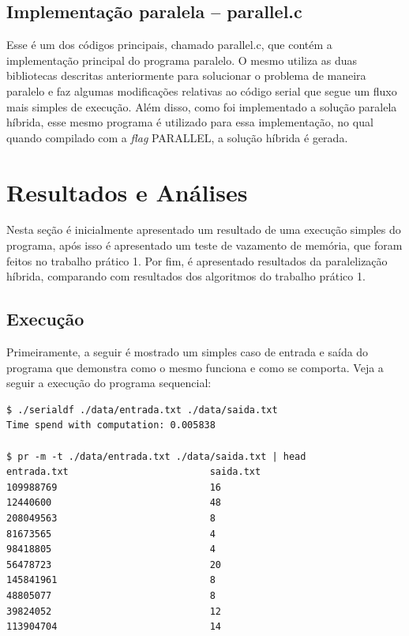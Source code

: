 \documentclass[12pt]{article}
\begin{document}
\subsection{Implementação paralela -- parallel.c}

Esse é um dos códigos principais, chamado parallel.c, que contém a implementação principal do programa paralelo. O mesmo utiliza as duas bibliotecas descritas anteriormente para solucionar o problema de maneira paralelo e faz algumas modificações relativas ao código serial que segue um fluxo mais simples de execução. Além disso, como foi implementado a solução paralela híbrida, esse mesmo programa é utilizado para essa implementação, no qual quando compilado com a \textit{flag} PARALLEL, a solução híbrida é gerada.

\section{Resultados e Análises}
\label{sec:resultados_analises}

Nesta seção é inicialmente apresentado um resultado de uma execução simples do programa, após isso é apresentado um teste de vazamento de memória, que foram feitos no trabalho prático 1. Por fim, é apresentado resultados da paralelização híbrida, comparando com resultados dos algoritmos do trabalho prático 1.

\subsection{Execução}

Primeiramente, a seguir é mostrado um simples caso de entrada e saída do programa que demonstra como o mesmo funciona e como se comporta. Veja a seguir a execução do programa sequencial:

\begin{verbatim}
$ ./serialdf ./data/entrada.txt ./data/saida.txt  
Time spend with computation: 0.005838

$ pr -m -t ./data/entrada.txt ./data/saida.txt | head
entrada.txt                         saida.txt
109988769                           16
12440600                            48
208049563                           8
81673565                            4
98418805                            4
56478723                            20
145841961                           8
48805077                            8
39824052                            12
113904704                           14
\end{verbatim}
\end{document}
